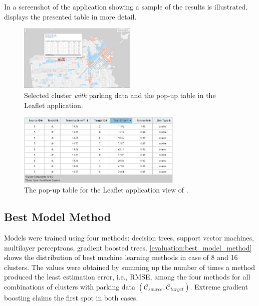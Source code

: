 \label{evaluation:training_testing_errors}
In  a screenshot of the application showing a sample of the results is illustrated.  displays the presented table in more detail.

\begin{figure}[!ht]
	\centering
	\includegraphics[width=0.5\textwidth]{graphics/cwith_source_dt_cosine.png}
	\caption{Selected cluster \textit{with} parking data and the pop-up table in the Leaflet application.}
	\label{fig:cwith}
\end{figure}

\begin{figure}[!ht]
	\centering
	\includegraphics[width=0.7\textwidth]{graphics/cwith_source_dt_cosine_table.png}
	\caption{The pop-up table for the Leaflet application view of  .}
	\label{fig:cwith_table}
\end{figure}

\subsection{Best Model Method}
\label{evaluation:best_model}
Models were trained using four methods: decision trees, support vector machines, multilayer perceptrons, gradient boosted trees. \autoref{evaluation:best_model_method} shows the distribution of best machine learning methods in case of 8 and 16 clusters.
The values were obtained by summing up the number of times a method produced the least estimation error, i.e., RMSE, among the four methods for all combinations of clusters with parking data $(\mathcal{C}_{source}, \mathcal{C}_{target})$.
Extreme gradient boosting claims the first spot in both cases.

